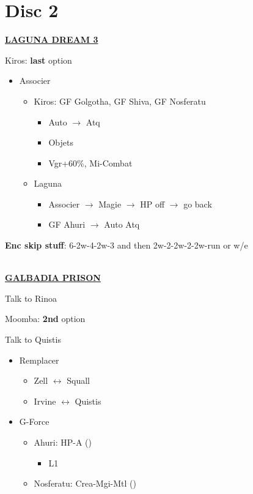 \chapter{Disc 2}

\underline{\textbf{LAGUNA DREAM 3}}

Kiros: \textbf{last} option

\begin{menu}
	\begin{itemize}
		\item Associer
			\begin{itemize}
				\item Kiros: GF Golgotha, GF Shiva, GF Nosferatu
					\begin{itemize}
						\item Auto $\rightarrow$ Atq
						\item Objets
						\item Vgr+60\%, Mi-Combat
					\end{itemize}
				\item Laguna
					\begin{itemize}
						\item Associer $\rightarrow$ Magie $\rightarrow$ HP off  $\rightarrow$ go back
						\item GF Ahuri  $\rightarrow$ Auto Atq
					\end{itemize}
			\end{itemize}
	\end{itemize}
\end{menu}

\textbf{Enc skip stuff}: 6-2w-4-2w-3 and then 2w-2-2w-2-2w-run or w/e

\leavevmode\\
\underline{\textbf{GALBADIA PRISON}}

Talk to Rinoa

Moomba: \textbf{2nd} option

Talk to Quistis

\begin{menu}
	\begin{itemize}
		\item Remplacer
			\begin{itemize}
				\item Zell $\leftrightarrow$ Squall
				\item Irvine $\leftrightarrow$ Quistis
			\end{itemize}
		\item G-Force
			\begin{itemize}
				\item Ahuri: HP-A ()
					\begin{itemize}
						\item L1
					\end{itemize}
				\item Nosferatu: Crea-Mgi-Mtl ()
			\end{itemize}
	\end{itemize}
\end{menu}

